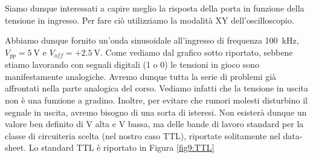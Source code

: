 Siamo dunque interessati a capire meglio la risposta della porta in funzione della tensione in ingresso.
Per fare ciò utilizziamo la modalità XY dell'oscilloscopio.

Abbiamo dunque fornito un'onda sinusoidale all'ingresso di frequenza \SI{100}{\kilo\hertz}, $V_{pp}=\SI{5}{\volt}$ e $V_{off}=+\SI{2.5}{\volt}$.
Come vediamo dal grafico sotto riportato, sebbene stiamo lavorando con segnali digitali (1 o 0) le tensioni in gioco sono manifestamente analogiche.
Avremo dunque tutta la serie di problemi già affrontati nella parte analogica del corso.
Vediamo infatti che la tensione in uscita non è una funzione a gradino.
Inoltre, per evitare che rumori molesti disturbino il segnale in uscita, avremo bisogno di una sorta di isteresi.
Non esisterà dunque un valore ben definito di V alta e V bassa, ma delle bande di lavoro standard per la classe di circuiteria scelta (nel nostro caso TTL), riportate solitamente nel data-sheet.
Lo standard TTL è riportato in Figura \ref{fig9:TTL}

